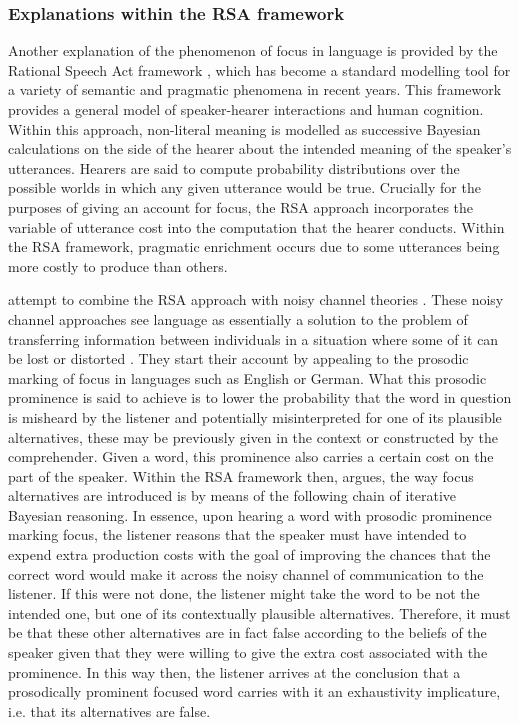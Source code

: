 \documentclass[output=paper,colorlinks,citecolor=brown]{langscibook}
\begin{document}
\subsubsection{Explanations within the RSA framework}

Another explanation of the phenomenon of focus in language is provided by the Rational Speech Act framework \citep{goodman2016pragmatic,franke2016probabilistic}, which has become a standard modelling tool for a variety of semantic and pragmatic phenomena in recent years. This framework provides a general model of speaker-hearer interactions and human cognition. Within this approach, non-literal meaning is modelled as successive Bayesian calculations on the side of the hearer about the intended meaning of the speaker's utterances. Hearers are said to compute probability distributions over the possible worlds in which any given utterance would be true. Crucially for the purposes of giving an account for focus, the RSA approach incorporates the variable of utterance cost into the computation that the hearer conducts. Within the RSA framework, pragmatic enrichment occurs due to some utterances being more costly to produce than others.

\citet{bergen2015strategic} attempt to combine the RSA approach with noisy channel theories \citep{stevens2016focus,stevens2019noise}. These noisy channel approaches see language as essentially a solution to the problem of transferring information between individuals in a situation where some of it can be lost or distorted \citep{ShannonWeaver1949}. They start their account by appealing to the prosodic marking of focus in languages such as English or German. What this prosodic prominence is said to achieve is to lower the probability that the word in question is misheard by the listener and potentially misinterpreted for one of its plausible alternatives, these may be previously given in the context or constructed by the comprehender. Given a word, this prominence also carries a certain cost on the part of the speaker. Within the RSA framework then, \citet{stevens2016focus} argues, the way focus alternatives are introduced is by means of the following chain of iterative Bayesian reasoning. In essence, upon hearing a word with prosodic prominence marking focus, the listener reasons that the speaker must have intended to expend extra production costs with the goal of improving the chances that the correct word would make it across the noisy channel of communication to the listener. If this were not done, the listener might take the word to be not the intended one, but one of its contextually plausible alternatives. Therefore, it must be that these other alternatives are in fact false according to the beliefs of the speaker given that they were willing to give the extra cost associated with the prominence. In this way then, the listener arrives at the conclusion that a prosodically prominent focused word carries with it an exhaustivity implicature, i.e. that its alternatives are false.
\end{document}
